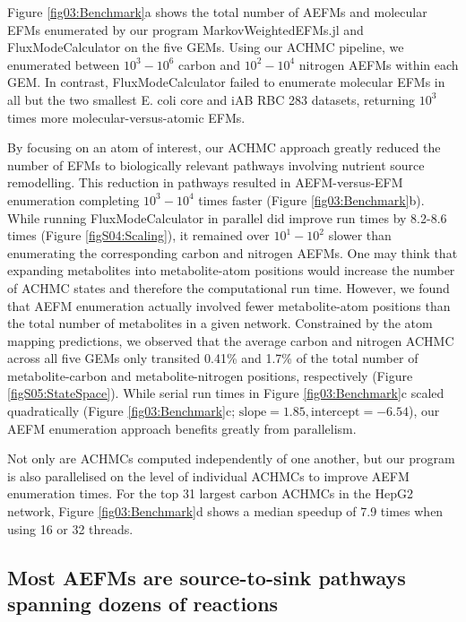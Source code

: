 \documentclass[12pt]{article}
\begin{document}
Figure \ref{fig03:Benchmark}a shows the total number of AEFMs and
molecular EFMs enumerated by our program MarkovWeightedEFMs.jl and
FluxModeCalculator on the five GEMs. Using our ACHMC pipeline, we
enumerated between $10^3 - 10^6$ carbon and $10^2-10^4$ nitrogen AEFMs
within each GEM. In contrast, FluxModeCalculator failed to enumerate
molecular EFMs in all but the two smallest E. coli core and iAB RBC 283
datasets, returning $10^3$ times more molecular-versus-atomic EFMs. 

By focusing on an atom of interest, our ACHMC approach greatly reduced the
number of EFMs to biologically relevant pathways involving nutrient source
remodelling. This reduction in pathways resulted in AEFM-versus-EFM
enumeration completing $10^3-10^4$ times faster (Figure
\ref{fig03:Benchmark}b). While running FluxModeCalculator in parallel did
improve run times by 8.2-8.6 times (Figure \ref{figS04:Scaling}), it
remained over $10^1-10^2$ slower than enumerating the corresponding carbon
and nitrogen AEFMs. One may think that expanding metabolites into
metabolite-atom positions would increase the number of ACHMC states and
therefore the computational run time. However, we found that AEFM
enumeration actually involved fewer metabolite-atom positions than the
total number of metabolites in a given network. Constrained by the atom
mapping predictions, we observed that the average carbon and nitrogen
ACHMC across all five GEMs only transited
0.41\% and 1.7\% of the total number of metabolite-carbon and
metabolite-nitrogen positions, respectively (Figure
\ref{figS05:StateSpace}). While serial run times in Figure
\ref{fig03:Benchmark}c scaled quadratically (Figure
\ref{fig03:Benchmark}c; $\text{slope}=1.85, \text{intercept}=-6.54$), our
AEFM enumeration approach benefits greatly from parallelism. 

Not only are ACHMCs computed independently of one another, but our program
is also parallelised on the level of individual ACHMCs to improve AEFM
enumeration times. For the top 31 largest carbon ACHMCs in the HepG2
network, Figure \ref{fig03:Benchmark}d shows a median speedup of 7.9 times
when using 16 or 32 threads. 

\subsection*{Most AEFMs are source-to-sink pathways spanning dozens of reactions}
\end{document}

